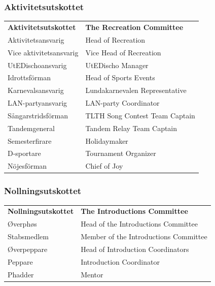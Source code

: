 \documentclass{dsekprotokoll}
\begin{document}
\subsubsection*{Aktivitetsutskottet}
\vspace{12pt}
\begin{center}
    \begin{tabular}{R{6.5cm}|L{6.5cm}}
        \textbf{Aktivitetsutskottet} & \textbf{The Recreation Committee}\\
        Aktivitetsansvarig & Head of Recreation\\
        Vice aktivitetsansvarig & Vice Head of Recreation\\
        UtEDischoansvarig & UtEDischo Manager\\
        Idrottsförman & Head of Sports Events\\
        Karnevalsansvarig & Lundakarnevalen Representative\\
        LAN-partyansvarig & LAN-party Coordinator\\
        Sångarstridsförman & TLTH Song Contest Team Captain\\
        Tandemgeneral & Tandem Relay Team Captain\\
        Semesterfirare & Holidaymaker\\
        D-sportare & Tournament Organizer\\
        Nöjesförman & Chief of Joy\\
    \end{tabular}
\end{center}

\subsubsection*{Nollningsutskottet}
\vspace{12pt}
\begin{center}
    \begin{tabular}{R{7.4cm}|L{7.4cm}}
        \textbf{Nollningsutskottet} & \textbf{The Introductions Committee}\\
        Øverphøs & Head of the Introductions Committee\\
        Stabsmedlem & Member of the Introductions Committee\\
        Øverpeppare & Head of Introduction Coordinators\\
        Peppare & Introduction Coordinator\\
        Phadder & Mentor\\
    \end{tabular}
\end{center}
\end{document}
